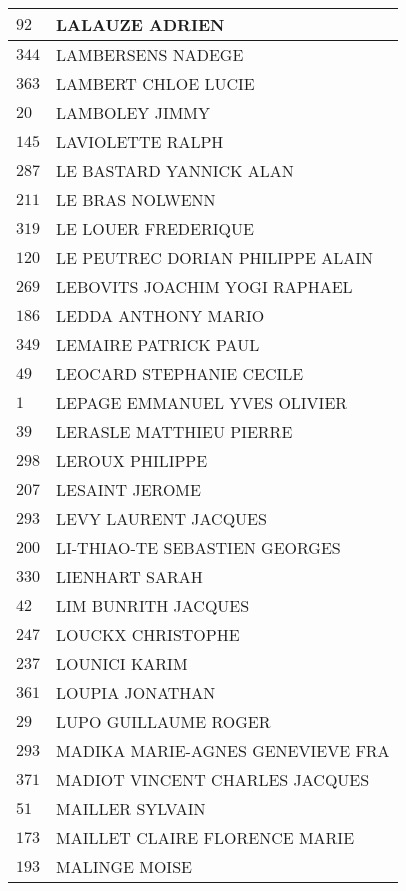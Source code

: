 \begin{xltabular}{\linewidth}{|l|X|}
    \hline
    $92$ & LALAUZE ADRIEN \\
    \hline
    $344$ & LAMBERSENS NADEGE \\
    \hline
    $363$ & LAMBERT CHLOE LUCIE \\
    \hline
    $20$ & LAMBOLEY JIMMY \\
    \hline
    $145$ & LAVIOLETTE RALPH \\
    \hline
    $287$ & LE BASTARD YANNICK ALAN \\
    \hline
    $211$ & LE BRAS NOLWENN \\
    \hline
    $319$ & LE LOUER FREDERIQUE \\
    \hline
    $120$ & LE PEUTREC DORIAN PHILIPPE ALAIN \\
    \hline
    $269$ & LEBOVITS JOACHIM YOGI RAPHAEL \\
    \hline
    $186$ & LEDDA ANTHONY MARIO \\
    \hline
    $349$ & LEMAIRE PATRICK PAUL \\
    \hline
    $49$ & LEOCARD STEPHANIE CECILE \\
    \hline
    $1$ & LEPAGE EMMANUEL YVES OLIVIER \\
    \hline
    $39$ & LERASLE MATTHIEU PIERRE \\
    \hline
    $298$ & LEROUX PHILIPPE \\
    \hline
    $207$ & LESAINT JEROME \\
    \hline
    $293$ & LEVY LAURENT JACQUES \\
    \hline
    $200$ & LI-THIAO-TE SEBASTIEN GEORGES \\
    \hline
    $330$ & LIENHART SARAH \\
    \hline
    $42$ & LIM BUNRITH JACQUES \\
    \hline
    $247$ & LOUCKX CHRISTOPHE \\
    \hline
    $237$ & LOUNICI KARIM \\
    \hline
    $361$ & LOUPIA JONATHAN \\
    \hline
    $29$ & LUPO GUILLAUME ROGER \\
    \hline
    $293$ & MADIKA MARIE-AGNES GENEVIEVE FRA \\
    \hline
    $371$ & MADIOT VINCENT CHARLES JACQUES \\
    \hline
    $51$ & MAILLER SYLVAIN \\
    \hline
    $173$ & MAILLET CLAIRE FLORENCE MARIE \\
    \hline
    $193$ & MALINGE MOISE \\

\end{xltabular}
